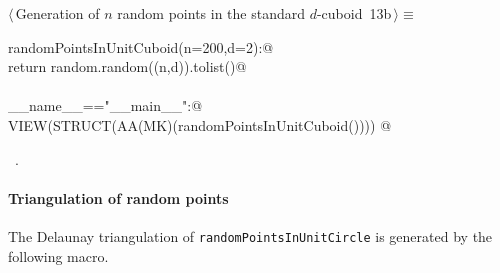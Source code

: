 \documentclass[11pt,oneside]{article}	%
\begin{document}
\begin{flushleft} \small \label{scrap20}
\protect{}$\langle\,$Generation of $n$ random points in the standard $d$-cuboid\nobreak\ {\footnotesize 13b}$\,\rangle\equiv$
\vspace{-1ex}
\begin{list}{}{} \item
\mbox{}\verb@def randomPointsInUnitCuboid(n=200,d=2):@\\
\mbox{}\verb@   return random.random((n,d)).tolist()@\\
\mbox{}\verb@@\\
\mbox{}\verb@if __name__=="__main__":@\\
\mbox{}\verb@   VIEW(STRUCT(AA(MK)(randomPointsInUnitCuboid()))) @\\
\mbox{}\verb@@{\NWsep}
\end{list}
\vspace{-1ex}
\footnotesize\addtolength{\baselineskip}{-1ex}
\begin{list}{}{\setlength{\itemsep}{-\parsep}\setlength{\itemindent}{-\leftmargin}}
\item \NWtxtMacroRefIn\ .
\end{list}
\end{flushleft}



\paragraph{Triangulation of random points} The Delaunay triangulation of \texttt{randomPointsInUnitCircle} is generated by the following macro.
\end{document}
